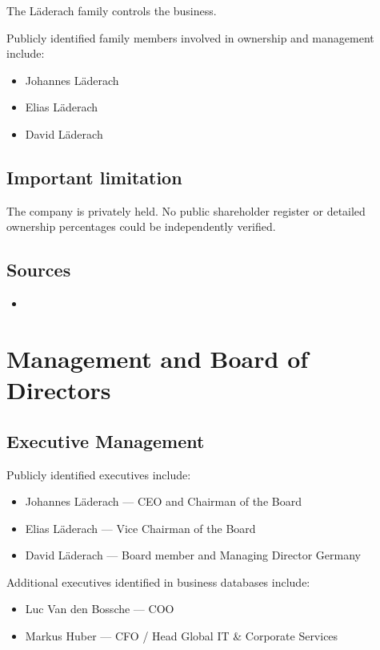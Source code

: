 The Läderach family controls the business.

Publicly identified family members involved in ownership and management include:

\begin{itemize}
    \item Johannes Läderach
    \item Elias Läderach
    \item David Läderach
\end{itemize}

\subsection*{Important limitation}

The company is privately held. No public shareholder register or detailed ownership percentages could be independently verified.

\subsection*{Sources}

\begin{itemize}
    \item \cite{laderachLeadershipNextGeneration}
\end{itemize}

\section{Management and Board of Directors}

\subsection{Executive Management}

Publicly identified executives include:

\begin{itemize}
    \item Johannes Läderach --- CEO and Chairman of the Board
    \item Elias Läderach --- Vice Chairman of the Board
    \item David Läderach --- Board member and Managing Director Germany
\end{itemize}

Additional executives identified in business databases include:

\begin{itemize}
    \item Luc Van den Bossche --- COO
    \item Markus Huber --- CFO / Head Global IT \& Corporate Services
\end{itemize}


